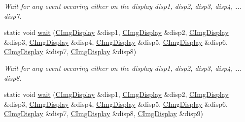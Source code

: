 \begin{DoxyCompactItemize}
\begin{DoxyCompactList}\small\item\em Wait for any event occuring either on the display {\ttfamily disp1}, {\ttfamily disp2}, {\ttfamily disp3}, {\ttfamily disp4}, ... {\ttfamily disp7}. \end{DoxyCompactList}\item 
\mbox{\label{structcimg__library__suffixed_1_1CImgDisplay_a174bf3ca1302994721e4775827923c5e}} 
static void \hyperlink{structcimg__library__suffixed_1_1CImgDisplay_a174bf3ca1302994721e4775827923c5e}{wait} (\hyperlink{structcimg__library__suffixed_1_1CImgDisplay}{C\+Img\+Display} \&disp1, \hyperlink{structcimg__library__suffixed_1_1CImgDisplay}{C\+Img\+Display} \&disp2, \hyperlink{structcimg__library__suffixed_1_1CImgDisplay}{C\+Img\+Display} \&disp3, \hyperlink{structcimg__library__suffixed_1_1CImgDisplay}{C\+Img\+Display} \&disp4, \hyperlink{structcimg__library__suffixed_1_1CImgDisplay}{C\+Img\+Display} \&disp5, \hyperlink{structcimg__library__suffixed_1_1CImgDisplay}{C\+Img\+Display} \&disp6, \hyperlink{structcimg__library__suffixed_1_1CImgDisplay}{C\+Img\+Display} \&disp7, \hyperlink{structcimg__library__suffixed_1_1CImgDisplay}{C\+Img\+Display} \&disp8)
\begin{DoxyCompactList}\small\item\em Wait for any event occuring either on the display {\ttfamily disp1}, {\ttfamily disp2}, {\ttfamily disp3}, {\ttfamily disp4}, ... {\ttfamily disp8}. \end{DoxyCompactList}\item 
\mbox{\label{structcimg__library__suffixed_1_1CImgDisplay_a5a598251e39624a94bbf21fdb3252da3}} 
static void \hyperlink{structcimg__library__suffixed_1_1CImgDisplay_a5a598251e39624a94bbf21fdb3252da3}{wait} (\hyperlink{structcimg__library__suffixed_1_1CImgDisplay}{C\+Img\+Display} \&disp1, \hyperlink{structcimg__library__suffixed_1_1CImgDisplay}{C\+Img\+Display} \&disp2, \hyperlink{structcimg__library__suffixed_1_1CImgDisplay}{C\+Img\+Display} \&disp3, \hyperlink{structcimg__library__suffixed_1_1CImgDisplay}{C\+Img\+Display} \&disp4, \hyperlink{structcimg__library__suffixed_1_1CImgDisplay}{C\+Img\+Display} \&disp5, \hyperlink{structcimg__library__suffixed_1_1CImgDisplay}{C\+Img\+Display} \&disp6, \hyperlink{structcimg__library__suffixed_1_1CImgDisplay}{C\+Img\+Display} \&disp7, \hyperlink{structcimg__library__suffixed_1_1CImgDisplay}{C\+Img\+Display} \&disp8, \hyperlink{structcimg__library__suffixed_1_1CImgDisplay}{C\+Img\+Display} \&disp9)

\end{DoxyCompactItemize}

